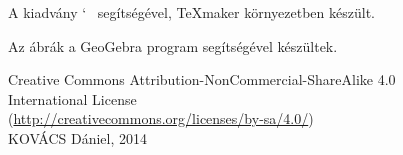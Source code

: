
\newpage
\thispagestyle{empty}
\null\vfill
\begin{center}
  A kiadv\'{a}ny \AmS{}`~\LaTeXe{} seg\'{i}ts\'{e}g\'{e}vel, \TeX{}maker
  k\"{o}rnyezetben k\'{e}sz\"{u}lt.
	
  Az \'{a}br\'{a}k a GeoGebra program seg\'{i}ts\'{e}g\'{e}vel
  k\'{e}sz\"{u}ltek.\\[4ex]	
	
  {\Large\cc\bysa}
  
  Creative Commons Attribution-NonCommercial-ShareAlike 4.0\\
  International License\\
  (\url{http://creativecommons.org/licenses/by-sa/4.0/})\\[4ex]
  
  KOV\'{A}CS D\'{a}niel, 2014
\end{center} 